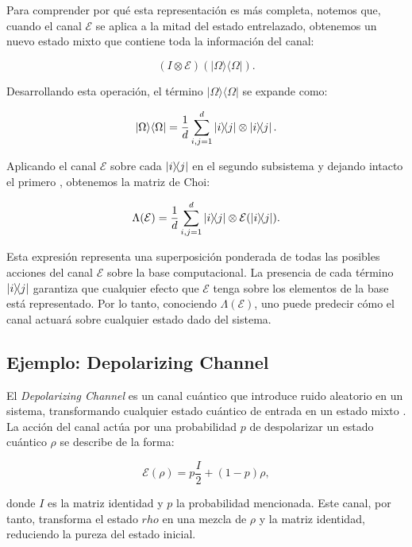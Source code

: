 \documentclass[11pt, spanish, letterpage]{report} %
\newcommand{\1}{\mathbb{1}}
\begin{document}
Para comprender por qué esta representación es más completa, notemos que, cuando el canal $\mathcal{E}$ se aplica a la mitad del estado entrelazado, obtenemos un nuevo estado mixto que contiene toda la información del canal:

\begin{equation}
(I \otimes \mathcal{E})(|\Omega\rangle\langle\Omega|).
\end{equation}

Desarrollando esta operación, el término $|\Omega\rangle\langle\Omega|$ se expande como:

\begin{equation}
|\Omega\rangle\langle\Omega| = \frac{1}{d} \sum_{i,j=1}^{d} \ketbra{i}{j} \otimes \ketbra{i}{j}.
\end{equation}

Aplicando el canal $\mathcal{E}$ sobre cada $\ketbra{i}{j}$ en el segundo subsistema y dejando intacto el primero , obtenemos la matriz de Choi:

\begin{equation}\label{ec:1.7}
\Lambda(\mathcal{E}) = \frac{1}{d} \sum_{i,j=1}^{d} \ketbra{i}{j} \otimes \mathcal{E}(\ketbra{i}{j}).
\end{equation}

Esta expresión representa una superposición ponderada de todas las posibles acciones del canal $\mathcal{E}$ sobre la base computacional. La presencia de cada término $\ketbra{i}{j}$ garantiza que cualquier efecto que $\mathcal{E}$ tenga sobre los elementos de la base está representado. Por lo tanto, conociendo $\Lambda(\mathcal{E})$, uno puede predecir cómo el canal actuará sobre cualquier estado dado del sistema.

\subsection{Ejemplo: Depolarizing Channel}

El \textit{Depolarizing Channel} es un canal cuántico que introduce ruido aleatorio en un sistema, transformando cualquier estado cuántico de entrada en un estado mixto \cite{nielsen_chuang_2011}. La acción del canal actúa por una probabilidad $p$ de despolarizar un estado cuántico $\rho$ se describe de la forma:

\begin{equation}
\mathcal{E}(\rho) = p \frac{I}{2} + (1 - p)\rho ,
\end{equation}

donde $I$ es la matriz identidad y $p$ la probabilidad mencionada. Este canal, por tanto, transforma el estado $rho$ en una mezcla de $\rho$ y la matriz identidad, reduciendo la pureza del estado inicial.
\end{document}
